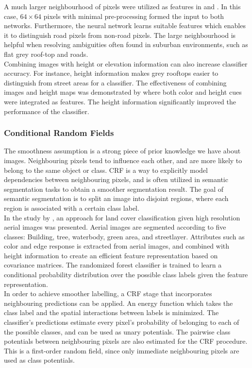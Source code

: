A much larger neighbourhood of pixels were utilized as features in \citep{Mnih_aerial_images_noisy} and \citep{Mnih_roads_high_res_aerial_images}. In this case, $64 \times 64$ pixels with minimal pre-processing formed the input to both  networks. Furthermore, the neural network learns suitable features which enables it to distinguish road pixels from non-road pixels. The large neighbourhood is helpful when resolving ambiguities often found in suburban environments, such as flat grey roof-top and roads. \\

  Combining images with height or elevation information can also increase classifier accuracy. For instance, height information makes grey rooftops easier to distinguish from street areas for a classifier. The effectiveness of combining images and height maps was demonstrated by \cite{Kluckner_semantic_height} where both color and height cues were integrated as features. The height information significantly improved the performance of the classifier.
  

\subsubsection{Conditional Random Fields}
The smoothness assumption is a strong piece of prior knowledge we have about images. Neighbouring pixels tend to influence each other, and are more likely to belong to the same object or class. \ac{CRF} is a way to explicitly model dependencies between neighbouring pixels, and is often utilized in semantic segmentation tasks to obtain a smoother segmentation result. The goal of semantic segmentation is to split an image into disjoint regions, where each region is associated with a certain class label.\\

In the study by \cite{Kluckner_semantic_height}, an approach for land cover classification given high resolution aerial images was presented. Aerial images are segmented according to five classes: Building, tree, waterbody, green area, and streetlayer. Attributes such as color and edge response is extracted from aerial images, and combined with height information to create an efficient feature representation based on covariance matrices. The randomized forest classifier is trained to learn a conditional probability distribution over the possible class labels given the feature representation.\\

In order to achieve smoother labelling,  a \ac{CRF} stage that incorporates neighbouring predictions can be applied. An energy function which takes the class label and the spatial interactions between labels is minimized. The classifier's predictions estimate every pixel's probability of belonging to each of the possible classes, and can be used as unary potentials. The pairwise class potentials between neighbouring pixels are also estimated for the \ac{CRF} procedure. This is a first-order random field, since only immediate neighbouring pixels are used as class potentials. \\

